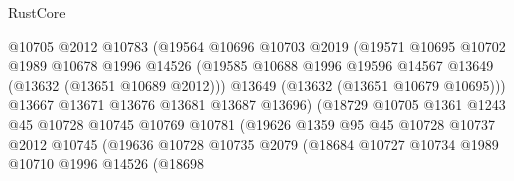 \begin{lexlean}{RustCore}
\begin{coremodule}
                                  @10705
                                  @2012
                                  @10783
                                  (@19564
                                    @10696
                                    @10703
                                    @2019
                                    (@19571
                                      @10695
                                      @10702
                                      @1989
                                      @10678
                                      @1996
                                      @14526
                                      (@19585
                                        @10688
                                        @1996
                                        @19596
                                        @14567
                                        @13649
                                        (@13632 (@13651 @10689 @2012)))
                                      @13649
                                      (@13632 (@13651 @10679 @10695)))
                                    @13667
                                    @13671
                                    @13676
                                    @13681
                                    @13687
                                    @13696)
                                  (@18729
                                    @10705
                                    @1361
                                    @1243
                                    @45
                                    @10728
                                    @10745
                                    @10769
                                    @10781
                                    (@19626
                                      @1359
                                      @95
                                      @45
                                      @10728
                                      @10737
                                      @2012
                                      @10745
                                      (@19636
                                        @10728
                                        @10735
                                        @2079
                                        (@18684
                                          @10727
                                          @10734
                                          @1989
                                          @10710
                                          @1996
                                          @14526
                                          (@18698

\end{coremodule}
\end{lexlean}
